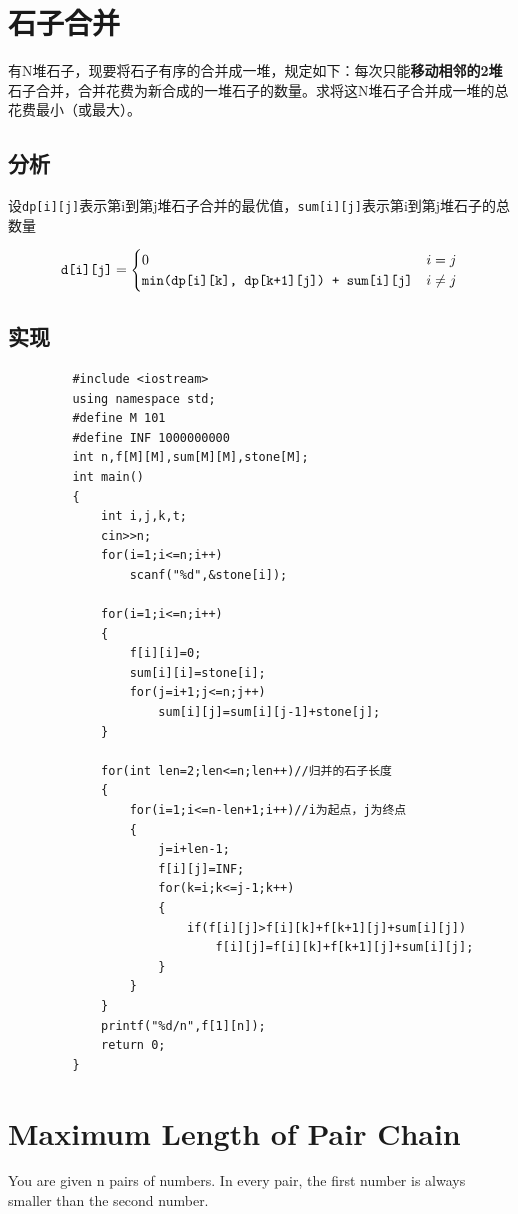 \documentclass[UTF8,a4paper,12pt]{ctexbook}
\begin{document}
\section{石子合并}
	有N堆石子，现要将石子有序的合并成一堆，规定如下：每次只能\textbf{移动相邻的2堆}石子合并，合并花费为新合成的一堆石子的数量。求将这N堆石子合并成一堆的总花费最小（或最大）。
	
	\subsection{分析}
		  设\verb|dp[i][j]|表示第i到第j堆石子合并的最优值，\verb|sum[i][j]|表示第i到第j堆石子的总数量
		  
		  $$
		  \verb|d[i][j]|=
		  \begin{cases}
		  				0 & i=j\\
		  			\verb|min(dp[i][k], dp[k+1][j]) + sum[i][j]| & i \not= j\\
		  \end{cases}
		  $$	
	  
	  \subsection{实现}
	  		\begin{lstlisting}
	     #include <iostream>     
	     using namespace std;  
	     #define M 101  
	     #define INF 1000000000  
	     int n,f[M][M],sum[M][M],stone[M];  
	     int main()  
	     {  
	         int i,j,k,t;  
	         cin>>n;  
	         for(i=1;i<=n;i++)  
	             scanf("%d",&stone[i]);  
	       
	         for(i=1;i<=n;i++)  
	         {  
	             f[i][i]=0;  
	             sum[i][i]=stone[i];  
	             for(j=i+1;j<=n;j++)  
	                 sum[i][j]=sum[i][j-1]+stone[j];  
	         }  
	       
	         for(int len=2;len<=n;len++)//归并的石子长度  
	         {  
	             for(i=1;i<=n-len+1;i++)//i为起点，j为终点  
	             {  
	                 j=i+len-1;  
	                 f[i][j]=INF;  
	                 for(k=i;k<=j-1;k++)  
	                 {  
	                     if(f[i][j]>f[i][k]+f[k+1][j]+sum[i][j])  
	                         f[i][j]=f[i][k]+f[k+1][j]+sum[i][j];  
	                 }  
	             }  
	         }  
	         printf("%d/n",f[1][n]);    
	         return 0;  
	     }  
	  		\end{lstlisting}
\section{Maximum Length of Pair Chain}
	You are given n pairs of numbers. In every pair, the first number is always smaller than the second number.
	
\end{document}
